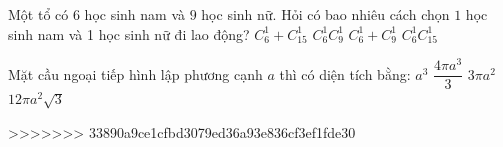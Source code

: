 \begin{ex}%
Một tổ có $6$ học sinh nam và $9$ học sinh nữ. Hỏi có bao nhiêu cách chọn $1$ học sinh nam và 1 học sinh nữ đi lao động?
\choice
{$C_6^1+C_{15}^1$}
{\True $C_6^1 C_9^1$}
{$C_6^1+C_9^1$}
{$C_6^1 C_{15}^1$}

\end{ex}

\begin{ex}%
Mặt cầu ngoại tiếp hình lập phương cạnh $a$ thì có diện tích bằng:
\choice
{$a^3$}
{$\dfrac{4\pi a^3}{3}$}
{\True $3\pi a^2$}
{$12\pi a^2 \sqrt{3}$}

\end{ex}

>>>>>>> 33890a9ce1cfbd3079ed36a93e836cf3ef1fde30
